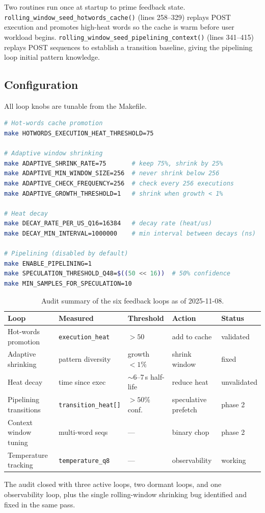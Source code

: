 Two routines run once at startup to prime feedback state.
\texttt{rolling\_window\_seed\_hotwords\_cache()} (lines 258--329) replays POST
execution and promotes high-heat words so the cache is warm before user workload
begins. \texttt{rolling\_window\_seed\_pipelining\_context()} (lines 341--415)
replays POST sequences to establish a transition baseline, giving the pipelining
loop initial pattern knowledge.

\subsection{Configuration}

All loop knobs are tunable from the Makefile.

\begin{lstlisting}[language=bash]
# Hot-words cache promotion
make HOTWORDS_EXECUTION_HEAT_THRESHOLD=75

# Adaptive window shrinking
make ADAPTIVE_SHRINK_RATE=75       # keep 75%, shrink by 25%
make ADAPTIVE_MIN_WINDOW_SIZE=256  # never shrink below 256
make ADAPTIVE_CHECK_FREQUENCY=256  # check every 256 executions
make ADAPTIVE_GROWTH_THRESHOLD=1   # shrink when growth < 1%

# Heat decay
make DECAY_RATE_PER_US_Q16=16384   # decay rate (heat/us)
make DECAY_MIN_INTERVAL=1000000    # min interval between decays (ns)

# Pipelining (disabled by default)
make ENABLE_PIPELINING=1
make SPECULATION_THRESHOLD_Q48=$((50 << 16))  # 50% confidence
make MIN_SAMPLES_FOR_SPECULATION=10
\end{lstlisting}

\begin{table}[ht]
\centering
\small
\begin{tabular}{lllll}
\toprule
Loop & Measured & Threshold & Action & Status \\
\midrule
Hot-words promotion & \texttt{execution\_heat} & $>50$ & add to cache & validated \\
Adaptive shrinking & pattern diversity & growth $<1\%$ & shrink window & fixed \\
Heat decay & time since exec & $\sim$6--7\,s half-life & reduce heat & unvalidated \\
Pipelining transitions & \texttt{transition\_heat[]} & $>50\%$ conf. & speculative prefetch & phase 2 \\
Context window tuning & multi-word seqs & --- & binary chop & phase 2 \\
Temperature tracking & \texttt{temperature\_q8} & --- & observability & working \\
\bottomrule
\end{tabular}
\caption{Audit summary of the six feedback loops as of 2025-11-08.}
\end{table}

The audit closed with three active loops, two dormant loops, and one
observability loop, plus the single rolling-window shrinking bug identified and
fixed in the same pass.
